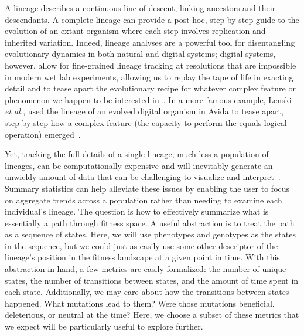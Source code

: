 \documentclass[letterpaper]{article}
\begin{document}
A lineage describes a continuous line of descent, linking ancestors and their descendants. A complete lineage can provide a post-hoc, step-by-step guide to the evolution of an extant organism where each step involves replication and inherited variation. Indeed, lineage analyses are a powerful tool for disentangling evolutionary dynamics in both natural and digital systems; digital systems, however, allow for fine-grained lineage tracking at resolutions that are impossible in modern wet lab experiments, allowing us to replay the tape of life in exacting detail and to tease apart the evolutionary recipe for whatever complex feature or phenomenon we happen to be interested in~\citep{mcphee_using_2016}. 
In a more famous example, Lenski \textit{et al.}, used the lineage of an evolved digital organism in Avida to tease apart, step-by-step how a complex feature (the capacity to perform the equals logical operation) emerged~\citep{lenski_evolutionary_2003}. %

Yet, tracking the full details of a single lineage, much less a population of lineages, can be computationally expensive and will inevitably generate an unwieldy amount of data that can be challenging to visualize and interpret~\citep{mcphee_visualizing_2016}.
Summary statistics can help alleviate these issues by enabling the user to focus on aggregate trends across a population rather than needing to examine each individual's lineage. The question is how to effectively summarize what is essentially a path through fitness space. A useful abstraction is to treat the path as a sequence of states. Here, we will use phenotypes and genotypes as the states in the sequence, but we could just as easily use some other descriptor of the lineage's position in the fitness landscape at a given point in time.
With this abstraction in hand, a few metrics are easily formalized: the number of unique states, the number of transitions between states, and the amount of time spent in each state.
Additionally, we may care about how the transitions between states happened. What mutations lead to them? Were those mutations beneficial, deleterious, or neutral at the time? Here, we choose a subset of these metrics that we expect will be particularly useful to explore further.
\end{document}
